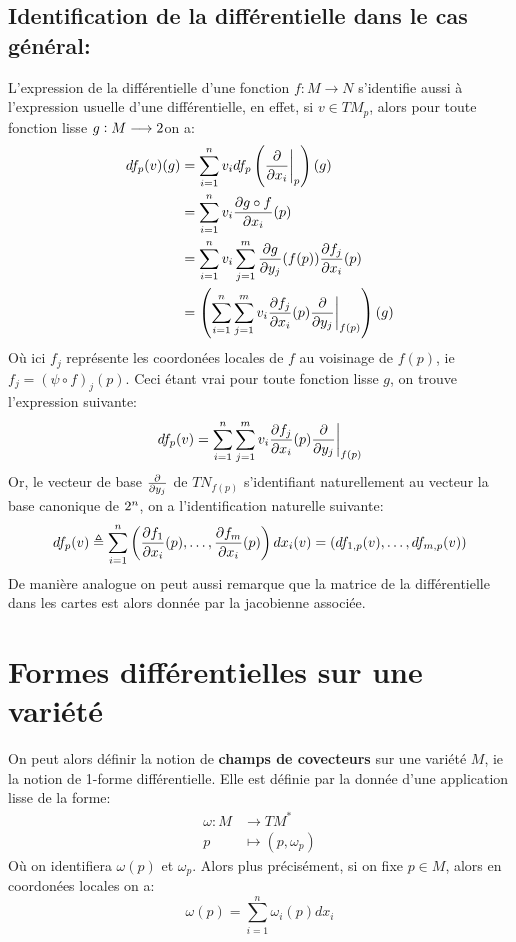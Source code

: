 \section{Identification de la différentielle dans le cas général:}
L'expression de la différentielle d'une fonction \( f : M \longrightarrow N \) s'identifie aussi à l'expression usuelle d'une différentielle, en effet, si \( v \in TM_p \), alors pour toute fonction lisse \( g : M \longrightarrow 2 \)on a:
\begin{align*}
   df_p(v)(g) &= \sum_{i=1}^n v_i df_p\left(\frac{\partial }{\partial x_i}\biggr|_p\right)(g)\\
   &= \sum_{i=1}^n v_i \frac{\partial g \circ f}{\partial x_i}(p)\\
   &= \sum_{i=1}^n v_i \sum_{j=1}^m \frac{\partial g}{\partial y_j}(f(p)) \frac{\partial f_j}{\partial x_i}(p)\\
   &= \left(\sum_{i=1}^n\sum_{j=1}^m v_i \frac{\partial f_j}{\partial x_i}(p)\frac{\partial }{\partial y_j}\biggr|_{f(p)}\right)(g)
\end{align*}
Où ici \( f_j \) représente les coordonées locales de \( f \) au voisinage de \( f(p) \), ie \( f_j = (\psi \circ f)_j(p) \). Ceci étant vrai pour toute fonction lisse \( g \), on trouve l'expression suivante:
\[ 
   df_p(v) = \sum_{i=1}^n\sum_{j=1}^m v_i \frac{\partial f_j}{\partial x_i}(p)\frac{\partial }{\partial y_j}\biggr|_{f(p)}
\]
Or, le vecteur de base \(\frac{\partial }{\partial y_j}\) de \( TN_{f(p)} \) s'identifiant naturellement au vecteur la base canonique de \( 2^n \), on a l'identification naturelle suivante:
\[ 
   df_p(v) \triangleq \sum_{i=1}^n \left( \frac{\partial f_1}{\partial x_i}(p), \ldots, \frac{\partial f_m}{\partial x_i}(p)\right)dx_i(v) = (df_{1, p}(v), \ldots, df_{m, p}(v))
\]
De manière analogue on peut aussi remarque que la matrice de la différentielle dans les cartes est alors donnée par la jacobienne associée.
\chapter{Formes différentielles sur une variété}
On peut alors définir la notion de \textbf{champs de covecteurs} sur une variété \( M \), ie la notion de 1-forme différentielle. Elle est définie par la donnée d'une application lisse de la forme:
\[ 
   \begin{aligned}
      \omega : M &\longrightarrow TM^* \\
      p &\longmapsto (p, \omega_p)
   \end{aligned} 
\]
Où on identifiera \( \omega(p) \) et \(\omega_p\). Alors plus précisément, si on fixe \( p \in M \), alors en coordonées locales on a:
\[ 
   \omega(p) = \sum_{i = 1}^n \omega_i(p) dx_i
\]

